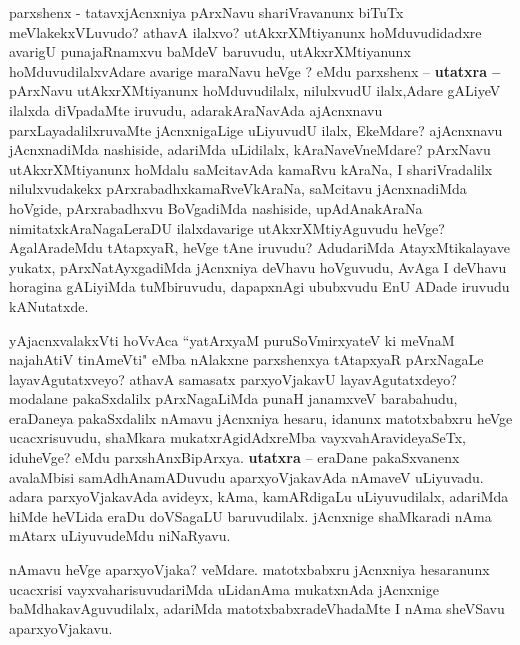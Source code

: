 \centerline{}

\begin{artha}
parxshenx - tatavxjAcnxniya pArxNavu shariVravanunx biTuTx meVlakekxVLuvudo? athavA ilalxvo? utAkxrXMtiyanunx hoMduvudidadxre avarigU punajaRnamxvu baMdeV baruvudu, utAkxrXMtiyanunx hoMduvudilalxvAdare avarige maraNavu heVge	? eMdu parxshenx --
\textbf{utatxra --} pArxNavu utAkxrXMtiyanunx hoMduvudilalx, nilulxvudU ilalx,Adare gALiyeV ilalxda diVpadaMte iruvudu, adarakAraNavAda ajAcnxnavu parxLayadalilxruvaMte jAcnxnigaLige uLiyuvudU ilalx, EkeMdare? ajAcnxnavu jAcnxnadiMda nashiside, adariMda uLidilalx, kAraNaveVneMdare? pArxNavu utAkxrXMtiyanunx hoMdalu saMcitavAda kamaRvu kAraNa, I shariVradalilx nilulxvudakekx pArxrabadhxkamaRveVkAraNa, saMcitavu jAcnxnadiMda hoVgide, pArxrabadhxvu BoVgadiMda nashiside, upAdAnakAraNa nimitatxkAraNagaLeraDU ilalxdavarige utAkxrXMtiyAguvudu heVge? AgalAradeMdu tAtapxyaR, heVge tAne iruvudu? AdudariMda AtayxMtikalayave yukatx, pArxNatAyxgadiMda jAcnxniya deVhavu hoVguvudu, AvAga I deVhavu horagina gALiyiMda tuMbiruvudu, dapapxnAgi ububxvudu EnU ADade iruvudu kANutatxde.
\end{artha}

\begin{artha}
yAjacnxvalakxVti hoVvAca ``yatArxyaM puruSoVmirxyateV ki meVnaM \break naja{\null}hAtiV tinAmeVti" eMba nAlakxne parxshenxya tAtapxyaR pArxNagaLe layavAgutatx\-veyo? athavA samasatx parxyoVjakavU layavAgutatxdeyo? modalane pakaSxdalilx pArxNa\-gaLiMda punaH janamxveV barabahudu, eraDaneya pakaSxdalilx nAmavu jAcnxniya hesaru, idanunx matotxbabxru heVge ucacxrisuvudu, shaMkara mukatxrAgidAdxreMba vayxvahAra\-videyaSeTx, iduheVge? eMdu parxshAnxBipArxya. \textbf{utatxra} -- eraDane pakaSxvanenx \-avalaMbisi samAdhAnamADuvudu aparxyoVjakavAda nAmaveV uLiyuvadu. adara parxyoVjakavAda avideyx, kAma, kamARdigaLu uLiyuvudilalx, adariMda hiMde heVLida eraDu doVSagaLU baruvudilalx. jAcnxnige shaMkaradi nAma mAtarx  uLiyuvudeMdu niNaRyavu.

nAmavu heVge aparxyoVjaka? veMdare. matotxbabxru jAcnxniya hesaranunx \-ucacxrisi vayxvaharisuvudariMda uLidanAma mukatxnAda jAcnxnige baMdhakavAgu\-vudilalx, adariMda matotxbabxradeVhadaMte I nAma sheVSavu aparxyoVjakavu.
\end{artha}

\centerline{}

